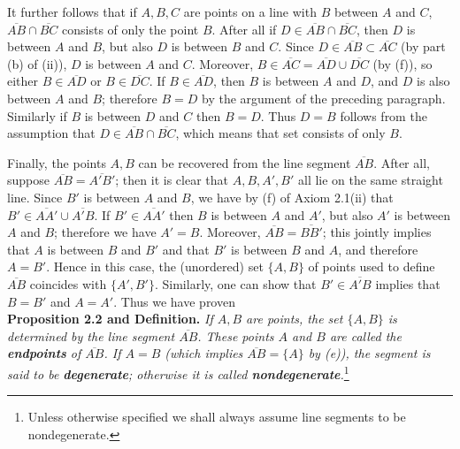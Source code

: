 \documentclass[leqno]{book}
\begin{document}
It further follows that if $A,B,C$ are points on a line with $B$ between $A$ and $C$, $\overline{AB}\cap\overline{BC}$ consists of only the point $B$.  After all if $D\in\overline{AB}\cap\overline{BC}$, then $D$ is between $A$ and $B$, but also $D$ is between $B$ and $C$.  Since $D\in\overline{AB}\subset\overline{AC}$ (by part (b) of (ii)), $D$ is between $A$ and $C$.  Moreover, $B\in\overline{AC}=\overline{AD}\cup\overline{DC}$ (by (f)), so either $B\in\overline{AD}$ or $B\in\overline{DC}$.  If $B\in\overline{AD}$, then $B$ is between $A$ and $D$, and $D$ is also between $A$ and $B$; therefore $B=D$ by the argument of the preceding paragraph.  Similarly if $B$ is between $D$ and $C$ then $B=D$.  Thus $D=B$ follows from the assumption that $D\in\overline{AB}\cap\overline{BC}$, which means that set consists of only $B$.

Finally, the points $A,B$ can be recovered from the line segment $\overline{AB}$.  After all, suppose $\overline{AB}=\overline{A'B'}$; then it is clear that $A,B,A',B'$ all lie on the same straight line.  Since $B'$ is between $A$ and $B$, we have by (f) of Axiom 2.1(ii) that $B'\in\overline{AA'}\cup\overline{A'B}$.  If $B'\in\overline{AA'}$ then $B$ is between $A$ and $A'$, but also $A'$ is between $A$ and $B$; therefore we have $A'=B$.  Moreover, $\overline{AB}=\overline{BB'}$; this jointly implies that $A$ is between $B$ and $B'$ and that $B'$ is between $B$ and $A$, and therefore $A=B'$.  Hence in this case, the (unordered) set $\{A,B\}$ of points used to define $\overline{AB}$ coincides with $\{A',B'\}$.  Similarly, one can show that $B'\in\overline{A'B}$ implies that $B=B'$ and $A=A'$.  Thus we have proven\\

\noindent\textbf{Proposition 2.2 and Definition.} \emph{If $A,B$ are points, the set $\{A,B\}$ is determined by the line segment $\overline{AB}$.  These points $A$ and $B$ are called the \textbf{endpoints} of $\overline{AB}$.  If $A=B$ (which implies $\overline{AB}=\{A\}$ by (e)), the segment is said to be \textbf{degenerate}; otherwise it is called \textbf{nondegenerate}.}\footnote{Unless otherwise specified we shall always assume line segments to be nondegenerate.}\\
\end{document}
